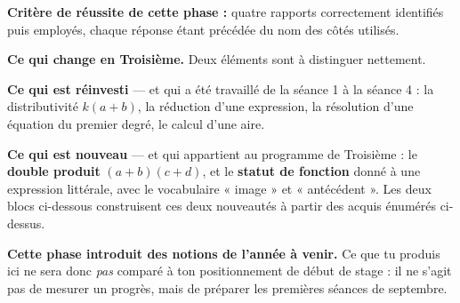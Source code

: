 \documentclass[10pt,a4paper]{article}
\begin{document}
\begin{successbox}\textbf{Critère de réussite de cette phase :} quatre rapports correctement identifiés puis employés, chaque réponse étant précédée du nom des côtés utilisés.\end{successbox}
\certline
\needspace{62mm}\par\vspace{3mm}

\begin{methodbox}
\textbf{Ce qui change en Troisième.} Deux éléments sont à distinguer nettement.
\par\smallskip
\textbf{Ce qui est réinvesti} — et qui a été travaillé de la séance 1 à la séance 4 : la distributivité
$k(a+b)$, la réduction d'une expression, la résolution d'une équation du premier degré, le calcul d'une aire.
\par\smallskip
\textbf{Ce qui est nouveau} — et qui appartient au programme de Troisième : le \textbf{double produit}
$(a+b)(c+d)$, et le \textbf{statut de fonction} donné à une expression littérale, avec le vocabulaire
« image » et « antécédent ». Les deux blocs ci-dessous construisent ces deux nouveautés à partir des acquis
énumérés ci-dessus.
\end{methodbox}
\begin{warningbox}\small
\textbf{Cette phase introduit des notions de l'année à venir.} Ce que tu produis ici ne sera donc
\emph{pas} comparé à ton positionnement de début de stage : il ne s'agit pas de mesurer un progrès,
mais de préparer les premières séances de septembre.
\end{warningbox}
\end{document}
